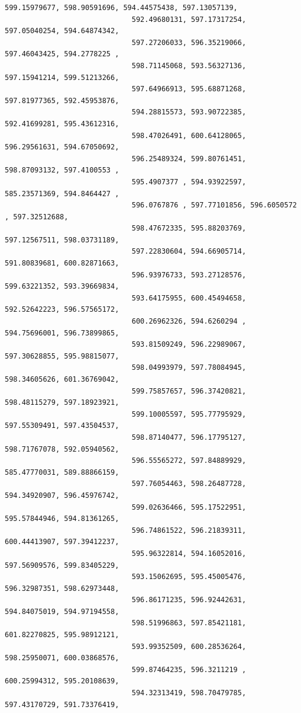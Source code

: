 \documentclass[11pt]{article}
\begin{document}
\begin{Verbatim}[commandchars=\\\{\}]
                              599.15979677, 598.90591696, 594.44575438, 597.13057139,
                              592.49680131, 597.17317254, 597.05040254, 594.64874342,
                              597.27206033, 596.35219066, 597.46043425, 594.2778225 ,
                              598.71145068, 593.56327136, 597.15941214, 599.51213266,
                              597.64966913, 595.68871268, 597.81977365, 592.45953876,
                              594.28815573, 593.90722385, 592.41699281, 595.43612316,
                              598.47026491, 600.64128065, 596.29561631, 594.67050692,
                              596.25489324, 599.80761451, 598.87093132, 597.4100553 ,
                              595.4907377 , 594.93922597, 585.23571369, 594.8464427 ,
                              596.0767876 , 597.77101856, 596.6050572 , 597.32512688,
                              598.47672335, 595.88203769, 597.12567511, 598.03731189,
                              597.22830604, 594.66905714, 591.80839681, 600.82871663,
                              596.93976733, 593.27128576, 599.63221352, 593.39669834,
                              593.64175955, 600.45494658, 592.52642223, 596.57565172,
                              600.26962326, 594.6260294 , 594.75696001, 596.73899865,
                              593.81509249, 596.22989067, 597.30628855, 595.98815077,
                              598.04993979, 597.78084945, 598.34605626, 601.36769042,
                              599.75857657, 596.37420821, 598.48115279, 597.18923921,
                              599.10005597, 595.77795929, 597.55309491, 597.43504537,
                              598.87140477, 596.17795127, 598.71767078, 592.05940562,
                              596.55565272, 597.84889929, 585.47770031, 589.88866159,
                              597.76054463, 598.26487728, 594.34920907, 596.45976742,
                              599.02636466, 595.17522951, 595.57844946, 594.81361265,
                              596.74861522, 596.21839311, 600.44413907, 597.39412237,
                              595.96322814, 594.16052016, 597.56909576, 599.83405229,
                              593.15062695, 595.45005476, 596.32987351, 598.62973448,
                              596.86171235, 596.92442631, 594.84075019, 594.97194558,
                              598.51996863, 597.85421181, 601.82270825, 595.98912121,
                              593.99352509, 600.28536264, 598.25950071, 600.03868576,
                              599.87464235, 596.3211219 , 600.25994312, 595.20108639,
                              594.32313419, 598.70479785, 597.43170729, 591.73376419,

\end{Verbatim}
\end{document}
